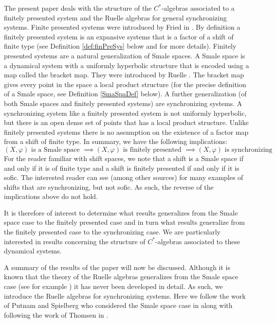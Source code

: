 \documentclass{amsart}
\theoremstyle{plain}
\theoremstyle{definition}
\theoremstyle{remark}
\begin{document}
The present paper deals with the structure of the $C^\ast$-algebras associated to a finitely presented system and the Ruelle algebras for general synchronizing systems. Finite presented systems were introduced by Fried in \cite{fried1987}. By definition a finitely presented system is an expansive systems that is a factor of a shift of finite type (see Definition \ref{def:finPreSys} below and \cite{fried1987} for more details). Finitely presented systems are a natural generalization of Smale spaces. A Smale space is a dynamical system with a uniformly hyperbolic structure that is encoded using a map called the bracket map. They were introduced by Ruelle \cite{ruelle_2004}. The bracket map gives every point in the space a local product structure (for the precise definition of a Smale space, see Definition \ref{SmaSpaDef} below). A further generalization (of both Smale spaces and finitely presented systems) are synchronizing systems. A synchronizing system like a finitely presented system is not uniformly hyperbolic, but there is an open dense set of points that has a local product structure. Unlike finitely presented systems there is no assumption on the existence of a factor map from a shift of finite type. In summary, we have the following implications:
\[ (X,\varphi) \text{ is a Smale space } \implies (X,\varphi) \text{ is finitely presented } \implies (X,\varphi) \text{ is synchronizing } \] 
For the reader familiar with shift spaces, we note that a shift is a Smale space if and only if it is of finite type and a shift is finitely presented if and only if it is sofic. The interested reader can see \cite{DeeStoShift} (among other sources) for many examples of shifts that are synchronizing, but not sofic. As such, the reverse of the implications above do not hold. 

It is therefore of interest to determine what results generalizes from the Smale space case to the finitely presented case and in turn what results generalize from the finitely presented case to the synchronizing case. We are particularly interested in results concerning the structure of $C^*$-algebras associated to these dynamical systems.

A summary of the results of the paper will now be discussed. Although it is known that the theory of the Ruelle algebras generalizes from the Smale space case (see for example \cite[Introduction]{thomsen2010c}) it has never been developed in detail. As such, we introduce the Ruelle algebras for synchronizing systems. Here we follow the work of Putnam and Spielberg who considered the Smale space case in \cite{putnam99} along with following the work of Thomsen in \cite{thomsen2010c}. 
\end{document}
